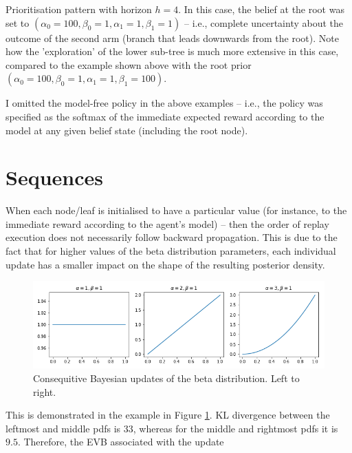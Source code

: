 \documentclass{article}
\begin{document}


\newpage
Prioritisation pattern with horizon $h=4$. In this case, the belief at the root was set to 
$(\alpha_0=100, \beta_0=1, \alpha_1=1, \beta_1=1)$ -- i.e., complete uncertainty about 
the outcome of the second arm (branch that leads downwards from the root). Note how the 
'exploration' of the lower sub-tree is much more extensive in this case, compared to the 
example shown above with the root prior $(\alpha_0=100, \beta_0=1, \alpha_1=1, \beta_1=100)$.
\vspace{1cm}



\newpage
I omitted the model-free policy in the above examples -- i.e., the policy was specified as the 
softmax of the immediate expected reward according to the model at any given belief state 
(including the root node). 

\section*{Sequences}
When each node/leaf is initialised to have a particular value (for instance, to the immediate 
reward according to the agent's model) -- then the order of replay execution does not necessarily 
follow backward propagation. This is due to the fact that for higher values of the beta distribution 
parameters, each individual update has a smaller impact on the shape of the resulting posterior density. 

\begin{figure}[h!]
    \centering
    \includegraphics[width=1\textwidth]{../Data/betas.png}
    \caption{Consequitive Bayesian updates of the beta distribution. Left to right.}
    \label{fig1}
\end{figure}

This is demonstrated in the example in Figure \ref{fig1}. KL divergence between the 
leftmost and middle pdfs is $33$, whereas for the middle and rightmost pdfs it is $9.5$.
Therefore, the EVB associated with the update 
\end{document}
